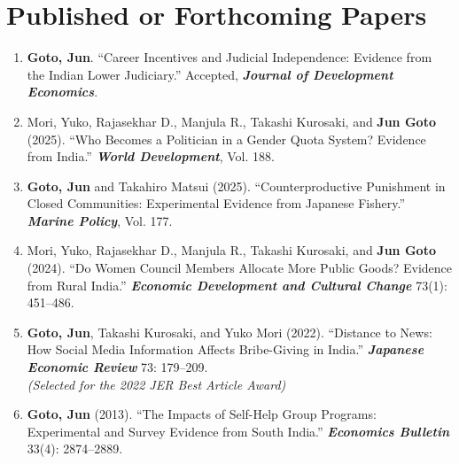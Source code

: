 \documentclass[12pt]{article}
\begin{document}
\section*{Published or Forthcoming Papers}
\begin{enumerate}
    \item \textbf{Goto, Jun}. 
    ``Career Incentives and Judicial Independence: Evidence from the Indian Lower Judiciary.'' Accepted, \textbf{\textit{Journal of Development Economics}}.

    \item Mori, Yuko, Rajasekhar D., Manjula R., Takashi Kurosaki, and \textbf{Jun Goto} (2025). 
    ``Who Becomes a Politician in a Gender Quota System? Evidence from India.'' 
    \textbf{\textit{World Development}}, Vol. 188.

    \item \textbf{Goto, Jun} and Takahiro Matsui (2025). 
    ``Counterproductive Punishment in Closed Communities: Experimental Evidence from Japanese Fishery.'' 
    \textbf{\textit{Marine Policy}}, Vol. 177.

    \item Mori, Yuko, Rajasekhar D., Manjula R., Takashi Kurosaki, and \textbf{Jun Goto} (2024). 
    ``Do Women Council Members Allocate More Public Goods? Evidence from Rural India.'' 
    \textbf{\textit{Economic Development and Cultural Change}} 73(1): 451--486.

    \item \textbf{Goto, Jun}, Takashi Kurosaki, and Yuko Mori (2022). 
    ``Distance to News: How Social Media Information Affects Bribe-Giving in India.'' 
    \textbf{\textit{Japanese Economic Review}} 73: 179--209. \\
    \textit{(Selected for the 2022 JER Best Article Award)}

    \item \textbf{Goto, Jun} (2013). 
    ``The Impacts of Self-Help Group Programs: Experimental and Survey Evidence from South India.'' 
    \textbf{\textit{Economics Bulletin}} 33(4): 2874--2889.
\end{enumerate}

\end{document}
